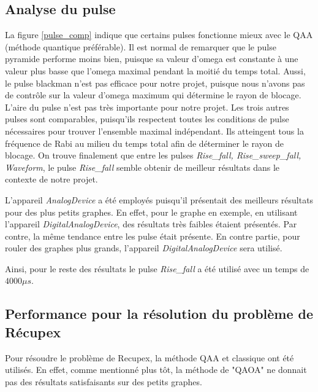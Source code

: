\documentclass[11pt]{article}
\begin{document}
\subsection{Analyse du pulse}
La figure \ref{pulse_comp} indique que certains pulses fonctionne mieux avec le QAA (méthode quantique préférable). Il est normal de remarquer que le pulse pyramide performe moins bien, puisque sa valeur d'omega est constante à une valeur plus basse que l'omega maximal pendant la moitié du temps total. Aussi, le pulse blackman n'est pas efficace pour notre projet, puisque nous n'avons pas de contrôle sur la valeur d'omega maximum qui détermine le rayon de blocage. L'aire du pulse n'est pas très importante pour notre projet. Les trois autres pulses sont comparables, puisqu'ils respectent toutes les conditions de pulse nécessaires pour trouver l'ensemble maximal indépendant. Ils atteingent tous la fréquence de Rabi au milieu du temps total afin de déterminer le rayon de blocage.
On trouve finalement que entre les pulses \textit{Rise\_fall, Rise\_sweep\_fall, Waveform}, le pulse \textit{Rise\_fall} semble obtenir de meilleur résultats dans le contexte de notre projet.

L'appareil \textit{AnalogDevice} a été employés puisqu'il présentait des meilleurs résultats pour des plus petits graphes. En effet, pour le graphe en exemple, en utilisant l'appareil \textit{DigitalAnalogDevice}, des résultats très faibles étaient présentés. Par contre, la même tendance entre les pulse était présente. En contre partie, pour rouler des graphes plus grands, l'appareil \textit{DigitalAnalogDevice} sera utilisé.

Ainsi, pour le reste des résultats le pulse \textit{Rise\_fall} a été utilisé avec un temps de $4000 \mu s$.

\subsection{Performance pour la résolution du problème de Récupex}
Pour résoudre le problème de Recupex, la méthode QAA et classique ont été utilisés. En effet, comme mentionné plus tôt, la méthode de "QAOA" ne donnait pas des résultats satisfaisants sur des petits graphes. 
\end{document}
